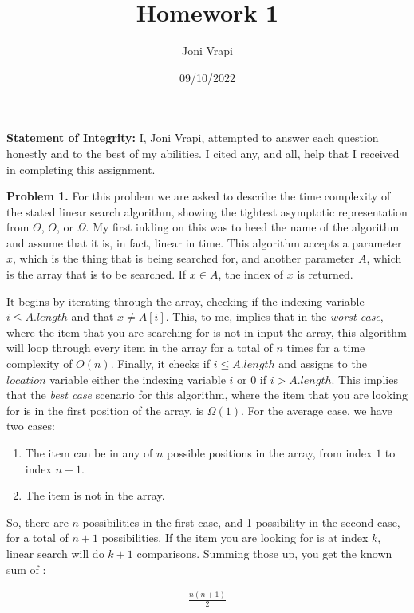 \documentclass{article}
\title{Homework 1}
\author{Joni Vrapi}
\date{09/10/2022}
\begin{document}
\maketitle

\textbf{Statement of Integrity:} I, Joni Vrapi, attempted to answer each question honestly and to the best of my abilities. I cited any, and all, help that I received in completing this assignment.

\hfill

\textbf{Problem 1.} For this problem we are asked to describe the time complexity of the stated linear search algorithm, showing the tightest asymptotic representation from $\Theta$, $O$, or $\Omega$. My first inkling on this was to heed the name of the algorithm and assume that it is, in fact, linear in time. This algorithm accepts a parameter $x$, which is the thing that is being searched for, and another parameter $A$, which is the array that is to be searched. If $x \in A$, the index of $x$ is returned. 

It begins by iterating through the array, checking if the indexing variable $i \leq A.length$ and that $x \neq A[i]$. This, to me, implies that in the \emph{worst case}, where the item that you are searching for is not in input the array, this algorithm will loop through every item in the array for a total of $n$ times for a time complexity of $O(n)$. Finally, it checks if $i \leq A.length$ and assigns to the $location$ variable either the indexing variable $i$ or $0$ if $i > A.length$. This implies that the \emph{best case} scenario for this algorithm, where the item that you are looking for is in the first position of the array, is $\Omega(1)$. For the average case, we have two cases:

\begin{enumerate}
    \item The item can be in any of $n$ possible positions in the array, from index $1$ to index $n+1$.
    \item The item is not in the array.
\end{enumerate}

So, there are $n$ possibilities in the first case, and 1 possibility in the second case, for a total of $n+1$ possibilities. If the item you are looking for is at index $k$, linear search will do $k+1$ comparisons. Summing those up, you get the known sum of \cite{website:2}:

\begin{gather}
    \frac{n(n+1)}{2}
\end{gather}
\end{document}
